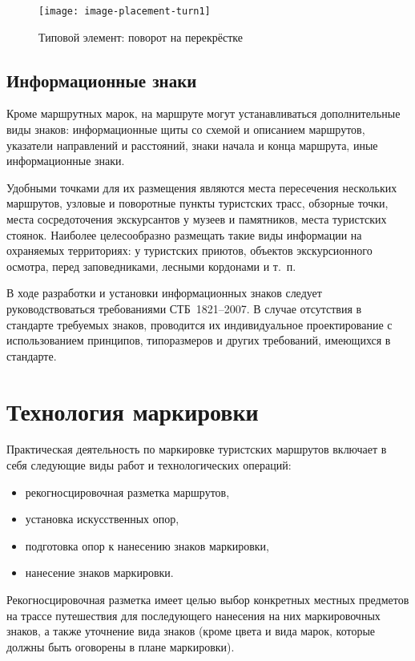 \documentclass[a5paper,10pt,titlepage]{extarticle}
\begin{document}
\begin{figure}[ht]
	\centering
	\texttt{[image: image-placement-turn1]}
	\caption{Типовой элемент: поворот на перекрёстке}\label{fig:placement-turn1}
\end{figure}


\subsection{Информационные знаки}
Кроме маршрутных марок, на маршруте могут устанавливаться дополнительные виды знаков: информационные щиты со схемой и
описанием маршрутов, указатели направлений и расстояний, знаки начала и конца маршрута, иные информационные знаки.

Удобными точками для их размещения являются места пересечения нескольких маршрутов, узловые и поворотные пункты
туристских трасс, обзорные точки, места сосредоточения экскурсантов у музеев и памятников, места туристских стоянок.
Наиболее целесообразно размещать такие виды информации на охраняемых территориях: у туристских приютов, объектов
экскурсионного осмотра, перед заповедниками, лесными кордонами и т.~п.

В ходе разработки и установки информационных знаков следует руководствоваться требованиями СТБ~1821--2007. В случае
отсутствия в стандарте требуемых знаков, проводится их индивидуальное проектирование с использованием принципов,
типоразмеров и других требований, имеющихся в стандарте.

\section{Технология маркировки}

Практическая деятельность по маркировке туристских маршрутов включает в себя следующие виды работ и технологических операций:

\begin{itemize}
	\item рекогносцировочная разметка маршрутов,
	\item установка искусственных опор,
	\item подготовка опор к нанесению знаков маркировки,
	\item нанесение знаков маркировки.
\end{itemize}

Рекогносцировочная разметка имеет целью выбор конкретных местных предметов на трассе путешествия для последующего
нанесения на них маркировочных знаков, а также уточнение вида знаков (кроме цвета и вида марок, которые должны быть
оговорены в плане маркировки).
\end{document}

